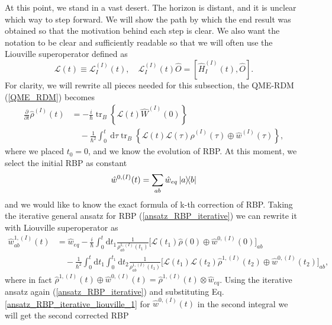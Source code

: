 At this point, we stand in a vast desert. The horizon is distant, and it is unclear which way to step forward. We will show the path by which the end result was obtained so that the motivation behind each step is clear. We also want the notation to be clear and sufficiently readable so that we will often use the Liouville superoperator defined as
\begin{equation}
    \mathcal{L}(t) \equiv  \mathcal{L}_{I}^{(I)}(t),\quad \mathcal{L}_{I}^{(I)}(t) \hat{O} = [\hat{H}_{I}^{(I)}(t), \hat{O}].
\end{equation}
For clarity, we will rewrite all pieces needed for this subsection, the QME-RDM (\ref{QME_RDM}) becomes 
\begin{equation}
\label{QME_RDM_liouvillian}
\begin{aligned}
    \frac{\partial}{\partial t}\hat{\rho}^{(I)}(t) &= -\frac{i}{\hbar} \operatorname{tr}_B \left\{\mathcal{L}(t) \hat{W}^{(I)}(0) \right\} \\
    &\quad -\frac{1}{\hbar^2} \int_{0}^{t} \mathrm{~d} \tau \operatorname{tr}_B \left\{\mathcal{L}(t) \mathcal{L}(\tau) \hat{\rho}^{(I)}(\tau) \oplus \hat{w}^{(I)}(\tau) \right\},
    \end{aligned}
\end{equation}
where we placed $t_0=0$, and we know the evolution of RBP. 
At this moment, we select the initial RBP as constant
\begin{equation}
\label{w_0_first_try}
    \hat{w}^{0, (I)}(t) = \sum_{ab} \hat{w}_{eq} \ketbra{a}{b}
\end{equation}
and we would like to know the exact formula of k-th correction of RBP. Taking the iterative general ansatz for RBP (\ref{ansatz_RBP_iterative}) we can rewrite it with Liouville superoperator as
\begin{equation}
\label{ansatz_RBP_iterative_liouville_1}
    \begin{aligned}
    \hat{w}^{1,(I)}_{ab}(t) &= \hat{w}_{eq} - \frac{i}{\hbar}\int_{0}^{t} \mathrm{d} t_1 \frac{1}{\rho_{ab}^{1, (I)}(t_1)} \Big[ \mathcal{L}(t_1) \hat{\rho}(0) \oplus \hat{w}^{0, (I)}(0)\Big]_{ab}  \\
     &\quad -\frac{1}{\hbar^2} \int_{0}^{t} \mathrm{d} t_1 \int_{0}^{t_1} \mathrm{d} t_2 \frac{1}{\rho_{ab}^{1, (I)}(t_1)} \Big[\mathcal{L}(t_1) \mathcal{L}(t_2) \hat{\rho}^{1, (I)}(t_2) \oplus \hat{w}^{0, (I)}(t_2)\Big]_{ab},
    \end{aligned}
\end{equation}
where in fact $\hat{\rho}^{1, (I)}(t) \oplus \hat{w}^{0, (I)}(t) = \hat{\rho}^{1, (I)}(t) \otimes \hat{w}_{eq}$. Using the iterative ansatz again (\ref{ansatz_RBP_iterative}) and substituting Eq. \ref{ansatz_RBP_iterative_liouville_1} for $\hat{w}^{0, (I)}(t)$ in the second integral we will get the second corrected RBP
